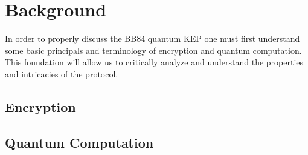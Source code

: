 \chapter{Background}
\label{chap:background}

In order to properly discuss the BB84 quantum KEP one must first understand some basic principals and terminology of encryption and quantum computation. 
This foundation will allow us to critically analyze and understand the properties and intricacies of the protocol.

\section{Encryption}



\section{Quantum Computation}

%


